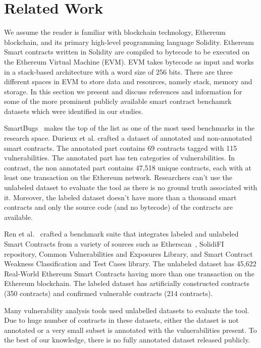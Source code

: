 \section{Related Work}
	\label{sec:relwork}
	We assume the reader is familiar with blockchain technology, Ethereum blockchain, and its primary high-level programming language Solidity.
	Ethereum Smart contracts written in Solidity are compiled to bytecode to be executed on the Ethereum Virtual Machine (EVM).
	EVM takes bytecode as input and works in a stack-based architecture with a word size of 256 bits.
	There are three different spaces in EVM to store data and resources, namely stack, memory and storage.
	In this section we present and discuss references and information for some of the more prominent publicly available smart contract benchamrk datasets which were identified in our studies.

	SmartBugs~\cite{Empirical-Review-of-Automated-Analysis-Tools-on-47587-Ethereum-Smart-Contracts} makes the top of the list as one of the most used benchmarks in the research space.
	Durieux et al. crafted a dataset of annotated and non-annotated smart contracts.
	The annotated part contains 69 contracts tagged with 115 vulnerabilities.
	The annotated part has ten categories of vulnerabilities.
	In contrast, the non annotated part contains 47,518 unique contracts, each with at least one transaction on the Ethereum network.
	Researchers can't use the unlabeled dataset to evaluate the tool as there is no ground truth associated with it.
	Moreover, the labeled dataset doesn't have more than a thousand smart contracts and only the source code (and no bytecode) of the contracts are available.

	Ren et al.~\cite{Empirical-Evaluation-of-Smart-Contract-Testing:What-is-the-Best-Choice} crafted a benchmark suite that integrates labeled and unlabeled Smart Contracts from a variety of sources such as Etherscan~\cite{etherscan}, SolidiFI repository, Common Vulnerabilities and Exposures Library, and Smart Contract Weakness Classification and Test Cases library.
	The unlabeled dataset has 45,622 Real-World Ethereum Smart Contracts having more than one transaction on the Ethereum blockchain.
	The labeled dataset has artificially constructed contracts (350 contracts) and confirmed vulnerable contracts (214 contracts).

	Many vulnerability analysis tools used unlabelled datasets to evaluate the tool.
	Due to huge number of contracts in these datasets, either the dataset is not annotated or a very small subset is annotated with the vulnerabilities present.
	To the best of our knowledge, there is no fully annotated dataset released publicly.

